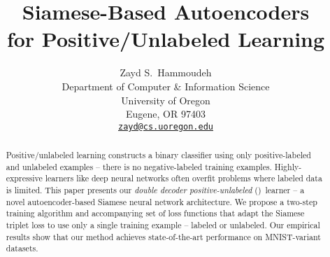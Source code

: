 \documentclass{article}
\title{Siamese-Based Autoencoders \\for Positive\-/Unlabeled Learning}
\author{%
  Zayd S.\ Hammoudeh \\
  Department of Computer \& Information Science \\
  University of Oregon \\
  Eugene, OR 97403 \\
  \texttt{\href{mailto:zayd@cs.uoregon.edu}{zayd@cs.uoregon.edu}}
}
\begin{document}
\maketitle

\begin{abstract}
  Positive\-/unlabeled learning constructs a binary classifier using only positive-labeled and unlabeled examples -- there is no negative-labeled training examples. Highly-expressive learners like deep neural networks often overfit problems where labeled data is limited.  This paper presents our \textit{double decoder positive-unlabeled} (\toolname)~learner -- a novel autoencoder-based Siamese neural network architecture.  We propose a two-step training algorithm and accompanying set of loss functions that adapt the Siamese triplet loss to use only a single training example -- labeled or unlabeled.  Our empirical results show that our method achieves state-of-the-art performance on MNIST-variant datasets.
\end{abstract}










\end{document}
